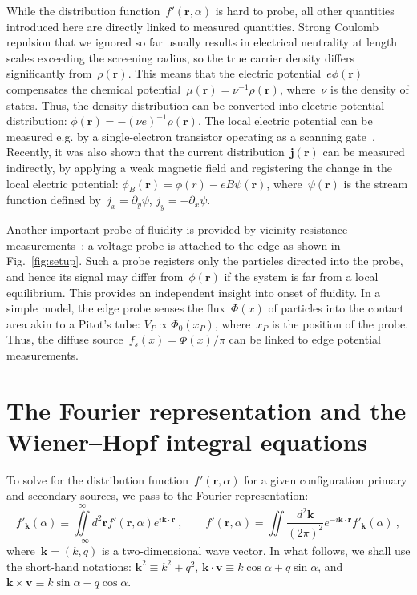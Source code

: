 \documentclass[preprint,aps,eqsecnum, prb]{revtex4-1}
\begin{document}
While the distribution
function~$f'({\bm r}, \alpha)$ is hard to probe, all other quantities
introduced here are directly linked to measured quantities.
Strong Coulomb repulsion
that we ignored so far usually  results in electrical neutrality
at length scales exceeding the screening radius, so the true carrier
density differs significantly from~$\rho({\bm r})$. This means that
the electric potential~$e\phi({\bm r})$ compensates the chemical
potential~$\mu({\bm r}) = \nu^{-1} \rho({\bm r})$, where~$\nu$
is the density of states. Thus, the density distribution can be converted
into electric
potential distribution: $\phi({\bm r}) = - (\nu e)^{-1} \rho({\bm r})$.
The local electric potential can be measured e.g. by a single-electron
transistor operating as a scanning gate~\cite{bib:Ilani}. Recently, it was
also shown\cite{bib:Measuring-Psi}
that the current distribution~${\bm j}({\bm r})$
can be measured indirectly, by applying
a weak magnetic field and registering the change in the local electric
potential: $\phi_B({\bm r}) = \phi(r) - eB \psi({\bm r})$,
where~$\psi({\bm r})$ is the stream function defined
by~$j_x = \partial_y \psi$, $j_y= -\partial_x \psi$.

Another important probe of fluidity is provided by
vicinity resistance measurements~\cite{bib:Bandurin, bib:Ensslin}:
a voltage probe is attached to the edge as shown in
Fig.~\ref{fig:setup}. Such a probe
registers only the particles directed into the probe, and hence
its signal may differ from~$\phi({\bm r})$ if the system is far from a
local equilibrium.  This provides an
independent insight into onset of fluidity. In a simple model, the
edge probe senses the flux~$\Phi(x)$ of particles into the contact area
akin to a Pitot's tube:
$V_P \propto \Phi_0(x_P)$, where~$x_P$ is the position of the probe.
Thus, the diffuse source~$f_s(x) = \Phi(x)/\pi$ can be linked to edge
potential measurements.


\section{The Fourier representation and the Wiener--Hopf integral equations}
\label{sec:fourier-wh}
To solve for the distribution function~$f'({\bm r}, \alpha)$ for a given configuration primary and
secondary sources,  we pass to the Fourier representation:
\begin{equation}
  \label{eq:fourier-definition}
  f'_{\bm k}(\alpha) \equiv \iint\limits_{-\infty}^{\infty}
   d^2{\bm r} f'({\bm r}, \alpha)
  e^{i {\bm k} \cdot{\bm r}}
  \ ,
  \qquad
  f'({\bm r}, \alpha) =
  \iint \frac{d^2 {\bm k}}{(2\pi)^2} e^{-i {\bm k}\cdot{\bm r}} f'_{\bm k}(\alpha)
  \ ,
\end{equation}
where~${\bm k} = (k, q)$ is a two-dimensional wave vector. In what follows,
we shall use the short-hand notations: ${\bm k}^2 \equiv k^2 + q^2$,
${\bm k}\cdot{\bm v} \equiv k \cos \alpha + q \sin\alpha$,
and~${\bm k}\times{\bm v} \equiv k \sin\alpha - q \cos\alpha$.
\end{document}
